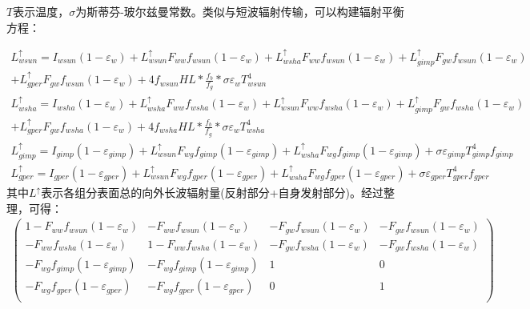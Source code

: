$T$表示温度，$\sigma$为斯蒂芬-玻尔兹曼常数。类似与短波辐射传输，可以构建辐射平衡方程：
\begin{landscape}
\begin{equation}
    \begin{aligned}
        L_{wsun}^{\uparrow}=I_{wsun}\left(1-\varepsilon_{w}\right)+L_{wsun}^{\uparrow} F_{ww} f_{wsun}\left(1-\varepsilon_{w}\right)+L_{wsha}^{\uparrow} F_{ww} f_{wsun}\left(1-\varepsilon_{w}\right)+L_{gimp}^{\uparrow} F_{g w} f_{wsun}\left(1-\varepsilon_{w}\right)\\+L_{gper}^{\uparrow} F_{g w} f_{wsun}\left(1-\varepsilon_{w}\right)+4 f_{wsun} H L * \frac{f_{b}}{f_{g}} * \sigma \varepsilon_{w} T_{wsun}^{4}\\
        L_{wsha}^{\uparrow}=I_{wsha}\left(1-\varepsilon_{w}\right)+L_{wsha}^{\uparrow} F_{ww} f_{wsha}\left(1-\varepsilon_{w}\right)+L_{wsun}^{\uparrow} F_{ww} f_{wsha}\left(1-\varepsilon_{w}\right)+L_{gimp}^{\uparrow} F_{g w} f_{wsha}\left(1-\varepsilon_{w}\right)\\+L_{gper}^{\uparrow} F_{g w} f_{wsha}\left(1-\varepsilon_{w}\right)+4 f_{wsha} H L * \frac{f_{b}}{f_{g}} * \sigma \varepsilon_{w} T_{wsha}^{4}\\
        L_{gimp}^{\uparrow}=I_{gimp}\left(1-\varepsilon_{gimp}\right)+L_{wsun}^{\uparrow} F_{w g} f_{gimp}\left(1-\varepsilon_{gimp}\right)+L_{wsha}^{\uparrow} F_{w g} f_{gimp}\left(1-\varepsilon_{gimp}\right)+\sigma \varepsilon_{gimp} T_{gimp}^{4} f_{gimp}\\
        L_{gper}^{\uparrow}=I_{gper}\left(1-\varepsilon_{gper}\right)+L_{wsun}^{\uparrow} F_{w g} f_{gper}\left(1-\varepsilon_{gper}\right)+L_{wsha}^{\uparrow} F_{w g} f_{gper}\left(1-\varepsilon_{gper}\right)+\sigma \varepsilon_{gper} T_{gper}^{4} f_{gper}
    \end{aligned}
\end{equation}
其中$L^\uparrow$表示各组分表面总的向外长波辐射量(反射部分+自身发射部分)。经过整理，可得：
\begin{equation}
\begin{aligned}
\left(\begin{matrix}1-F_{ww}f_{wsun}\left(1-\varepsilon_w\right)&-F_{ww}f_{wsun}\left(1-\varepsilon_w\right)&-F_{gw}f_{wsun}\left(1-\varepsilon_w\right)&-F_{gw}f_{wsun}\left(1-\varepsilon_w\right)\\-F_{ww}f_{wsha}\left(1-\varepsilon_w\right)&1-F_{ww}f_{wsha}\left(1-\varepsilon_w\right)&-F_{gw}f_{wsha}\left(1-\varepsilon_w\right)&-F_{gw}f_{wsha}\left(1-\varepsilon_w\right)\\-F_{wg}f_{gimp}\left(1-\varepsilon_{gimp}\right)&-F_{wg}f_{gimp}\left(1-\varepsilon_{gimp}\right)&1&0\\-F_{wg}f_{gper}\left(1-\varepsilon_{gper}\right)&-F_{wg}f_{gper}\left(1-\varepsilon_{gper}\right)&0&1\\\end{matrix}\right)

\end{aligned}
\end{equation}
\end{landscape}
